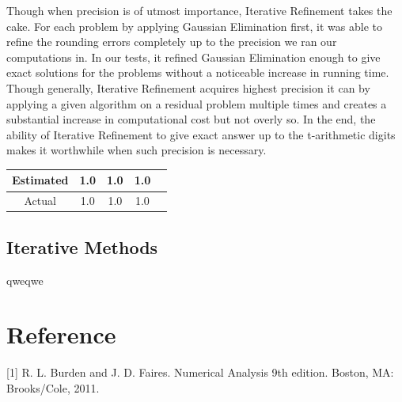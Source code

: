 \documentclass[11pt]{article}	%
\begin{document}
Though when precision is of utmost importance, Iterative Refinement takes the cake. For each problem by applying Gaussian Elimination first, it was able to refine the rounding errors completely up to the precision we ran our computations in. In our tests, it refined Gaussian Elimination enough to give exact solutions for the problems without a noticeable increase in running time. Though generally, Iterative Refinement acquires highest precision it can by applying a given algorithm on a residual problem multiple times and creates a substantial increase in computational cost but not overly so. In the end, the ability of Iterative Refinement to give exact answer up to the t-arithmetic digits makes it worthwhile when such precision is necessary.

\begin{center}
	 \label{tab:title}
    \begin{tabular}{||c|c|c|c|c||}
        \hline
        \multirow{2}{5em}{Estimated} & 1.0 & 1.0 &  1.0 \\ [.25em]
        \hline\hline
        \multirow{2}{5em}{Actual} & 1.0 & 1.0 & 1.0 \\ [.25em]
        \hline
    \end{tabular}
\end{center}\subsection{Iterative Methods}
qweqwe

\section{Reference}
[1] R. L. Burden and J. D. Faires. Numerical Analysis 9th edition. Boston, MA: Brooks/Cole, 2011.
\end{document}
